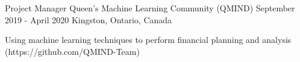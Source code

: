 
\begin{cventries}



  \cventry
    {Project Manager} %
    {Queen's Machine Learning Community (QMIND)} %
    {September 2019 - April 2020} %
    {Kingston, Ontario, Canada} %
    {
      \begin{cvitems} %
        \item {Using machine learning techniques to perform financial planning and analysis
(https://github.com/QMIND-Team)}
      \end{cvitems}
    }


\end{cventries}
